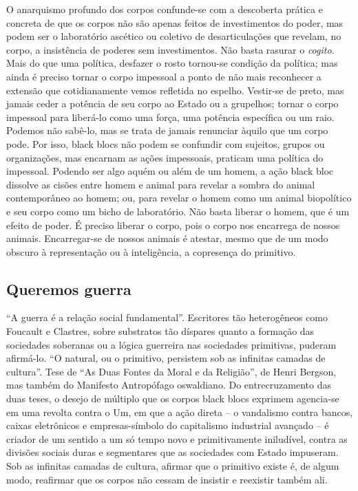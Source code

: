 O anarquismo profundo dos corpos confunde-se com a descoberta prática e
concreta de que os corpos não são apenas feitos de investimentos do
poder, mas podem ser o laboratório ascético ou coletivo de
desarticulações que revelam, no corpo, a insistência de poderes sem
investimentos. Não basta rasurar o \emph{cogito. }Mais do que uma
política, desfazer o rosto tornou-se condição da política; mas ainda é
preciso tornar o corpo impessoal a ponto de não mais reconhecer a
extensão que cotidianamente vemos refletida no espelho. Vestir-se de
preto, mas jamais ceder a potência de seu corpo ao Estado ou a
grupelhos; tornar o corpo impessoal para liberá-lo como uma força, uma
potência específica ou um raio. Podemos não sabê-lo, mas se trata de
jamais renunciar àquilo que um corpo pode. Por isso, black blocs não
podem se confundir com sujeitos, grupos ou organizações, mas encarnam as
ações impessoais, praticam uma política do impessoal. Podendo ser algo
aquém ou além de um homem, a ação black bloc dissolve as cisões entre
homem e animal para revelar a sombra do animal contemporâneo ao homem;
ou, para revelar o homem como um animal biopolítico e seu corpo como um
bicho de laboratório. Não basta liberar o homem, que é um efeito de
poder. É preciso liberar o corpo, pois o corpo nos encarrega de nossos
animais. Encarregar-se de nossos animais é atestar, mesmo que de um modo
obscuro à representação ou à inteligência, a copresença do primitivo.

\subsection{Queremos guerra}

``A guerra é a relação social fundamental''.
Escritores tão heterogêneos como Foucault e Clastres, sobre substratos
tão díspares quanto a formação das sociedades soberanas ou a lógica
guerreira nas sociedades primitivas, puderam afirmá-lo. ``O natural, ou
o primitivo, persistem sob as infinitas camadas de cultura''. Tese de
``As Duas Fontes da Moral e da Religião'', de Henri Bergson, mas também
do Manifesto Antropófago oswaldiano. Do entrecruzamento das duas teses,
o desejo de múltiplo que os corpos black blocs exprimem agencia-se em
uma revolta contra o Um, em que a ação direta -- o vandalismo contra
bancos, caixas eletrônicos e empresas-símbolo do capitalismo industrial
avançado -- é criador de um sentido a um só tempo novo e primitivamente
iniludível, contra as divisões sociais duras e segmentares que as
sociedades com Estado impuseram. Sob as infinitas camadas de cultura,
afirmar que o primitivo existe é, de algum modo, reafirmar que os corpos
não cessam de insistir e reexistir também ali.

